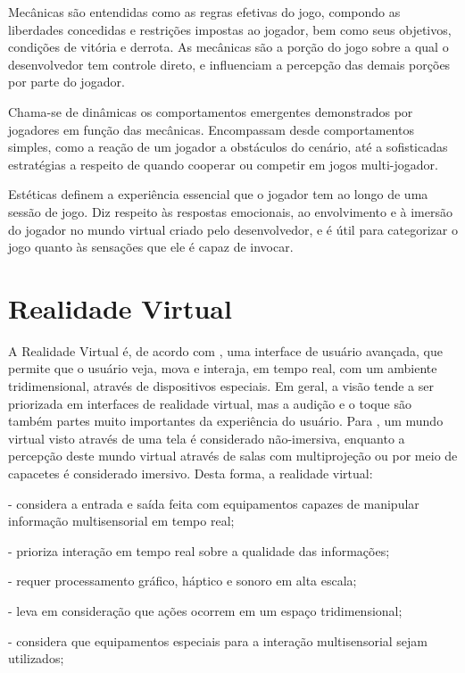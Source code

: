 Mecânicas são entendidas como as regras efetivas do jogo, compondo as liberdades concedidas e restrições impostas ao jogador, bem como seus objetivos, condições de vitória e derrota. As mecânicas são a porção do jogo sobre a qual o desenvolvedor tem controle direto, e influenciam a percepção das demais porções por parte do jogador.

Chama-se de dinâmicas os comportamentos emergentes demonstrados por jogadores em função das mecânicas. Encompassam desde comportamentos simples, como a reação de um jogador a obstáculos do cenário, até a sofisticadas estratégias a respeito de quando cooperar ou competir em jogos multi-jogador.

Estéticas definem a experiência essencial que o jogador tem ao longo de uma sessão de jogo. Diz respeito às respostas emocionais, ao envolvimento e à imersão do jogador no mundo virtual criado pelo desenvolvedor, e é útil para categorizar o jogo quanto às sensações que ele é capaz de invocar.


\section{Realidade Virtual}\label{sec-realidadevirtual}

A Realidade Virtual é, de acordo com \cite{kirner:2007:RV_e_RA}, uma interface de usuário avançada, que permite que o usuário veja, mova e interaja, em tempo real, com um ambiente tridimensional, através de dispositivos especiais. Em geral, a visão tende a ser priorizada em interfaces de realidade virtual, mas a audição e o toque são também partes muito importantes da experiência do usuário.
Para \cite{kirner:2011:evolucao_RV}, um mundo virtual visto através de uma tela é considerado não-imersiva, enquanto a percepção deste mundo virtual através de salas com multiprojeção ou por meio de capacetes é considerado imersivo. Desta forma, a realidade virtual:

- considera a entrada e saída feita com equipamentos capazes de manipular informação multisensorial em tempo real;

- prioriza interação em tempo real sobre a qualidade das informações;

- requer processamento gráfico, háptico e sonoro em alta escala;

- leva em consideração que ações ocorrem em um espaço tridimensional;

- considera que equipamentos especiais para a interação multisensorial sejam utilizados;

